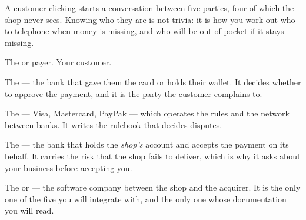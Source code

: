 A customer clicking  starts a conversation between five parties, four
of which the shop never sees. Knowing who they are is not trivia: it is how you
work out who to telephone when money is missing, and who will be out of pocket
if it stays missing.

\begin{definitionbox}
The  or payer. Your customer.

\smallskip
The  --- the bank that gave them the card or holds their wallet.
It decides whether to approve the payment, and it is the party the customer
complains to.

\smallskip
The  --- Visa, Mastercard, PayPak --- which operates the rules and
the network between banks. It writes the rulebook that decides disputes.

\smallskip
The  --- the bank that holds the \emph{shop's} account and
accepts the payment on its behalf. It carries the risk that the shop fails to
deliver, which is why it asks about your business before accepting you.

\smallskip
The  or  --- the software company
between the shop and the acquirer. It is the only one of the five you will
integrate with, and the only one whose documentation you will read.
\end{definitionbox}

